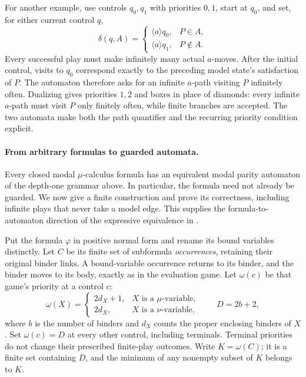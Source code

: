 For another example, use controls
\(q_0,q_1\) with priorities \(0,1\),
start at \(q_0\), and set, for either
current control \(q\),
\[
 \delta(q,A)=
 \begin{cases}
  \langle a\rangle q_0,&P\in A,\\
  \langle a\rangle q_1,&P\notin A.
 \end{cases}
\]
Every successful play must make
infinitely many actual \(a\)-moves.
After the initial control, visits
to \(q_0\) correspond exactly to
the preceding model state's
satisfaction of \(P\).
The automaton therefore asks for
an infinite \(a\)-path visiting
\(P\) infinitely often.
Dualizing gives priorities \(1,2\)
and boxes in place of diamonds:
every infinite \(a\)-path must
visit \(P\) only finitely often,
while finite branches are accepted.
The two automata make both the
path quantifier and the recurring
priority condition explicit.

\paragraph{From arbitrary formulas to guarded automata.}
\label{sec:p09-mu-automaton-construction}
Every closed modal \(\mu\)-calculus formula has an
equivalent modal parity automaton of the depth-one
grammar above. In particular, the formula need not
already be guarded. We now give a finite construction
and prove its correctness, including infinite plays
that never take a model edge. This supplies the
formula-to-automaton direction of the expressive
equivalence in \cite[\S5.3, thm.~5.2]{BradfieldStirling2007}.

Put the formula \(\varphi\) in positive normal form
and rename its bound variables distinctly.
Let \(C\) be its finite set of subformula
\emph{occurrences}, retaining their original binder
links. A bound-variable occurrence returns to its
binder, and the binder moves to its body, exactly
as in the evaluation game. Let \(\omega(c)\) be
that game's priority at a control \(c\):
\[
 \omega(X)=
 \begin{cases}
  2d_X+1,&X\text{ is a }\mu\text{-variable},\\
  2d_X,&X\text{ is a }\nu\text{-variable},
 \end{cases}
 \qquad D=2b+2,
\]
where \(b\) is the number of binders and \(d_X\)
counts the proper enclosing binders of \(X\).
Set \(\omega(c)=D\) at every other control,
including terminals. Terminal priorities do not
change their prescribed finite-play outcomes.
Write \(K=\omega(C)\); it is a finite set containing
\(D\), and the minimum of any nonempty subset
of \(K\) belongs to \(K\).

